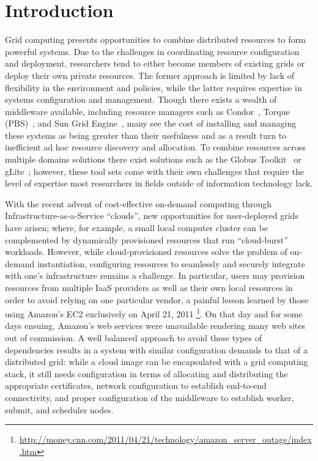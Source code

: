 \documentclass[twocolumn]{svjour3}
\begin{document}
\section{Introduction}

Grid computing presents opportunities to combine distributed resources to form
powerful systems.  Due to the challenges in coordinating resource configuration
and deployment, researchers tend to either become members of existing grids or
deploy their own private resources.  The former approach is limited by lack of
flexibility in the environment and policies, while the latter requires
expertise in systems configuration and management.  Though there exists a
wealth of middleware available, including resource managers such as
Condor~\cite{condor0}, Torque (PBS)~\cite{torque}, and Sun Grid
Engine~\cite{grid_engine}, many see the cost of installing and managing these
systems as being greater than their usefulness and as a result turn to
inefficient ad hoc resource discovery and allocation.  To combine resources
across multiple domains solutions there exist solutions such as the Globus
Toolkit~\cite{globus} or gLite~\cite{glite}; however, these tool sets come with
their own challenges that require the level of expertise most researchers in
fields outside of information technology lack.

With the recent advent of cost-effective on-demand computing through
Infrastructure-as-a-Service ``clouds'', new opportunities for user-deployed
grids have arisen; where, for example, a small local computer cluster can be
complemented by dynamically provisioned resources that run ``cloud-burst''
workloads.  However, while cloud-provisioned resources solve the problem of
on-demand instantiation, configuring resources to seamlessly and securely
integrate with one's infrastructure remains a challenge.  In particular, users
may provision resources from multiple IaaS providers as well as their own local
resources in order to avoid relying on one particular vendor, a painful lesson
learned by those using Amazon's EC2 exclusively on April 21, 2011
\footnote{\url{http://money.cnn.com/2011/04/21/technology/amazon_server_outage/index.htm}}.
On that day and for some days ensuing, Amazon's web services were unavailable
rendering many web sites out of commission.  A well balanced approach to avoid
these types of dependencies results in a system with similar configuration
demands to that of a distributed grid: while a cloud image can be encapsulated
with a grid computing stack, it still needs configuration in terms of
allocating and distributing the appropriate certificates, network configuration
to establish end-to-end connectivity, and proper configuration of the
middleware to establish worker, submit, and scheduler nodes.  
\end{document}
